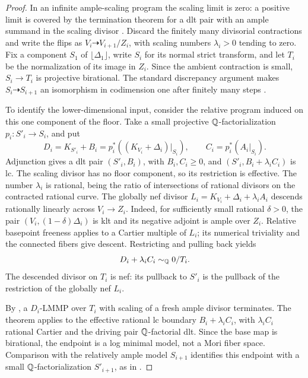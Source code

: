 \begin{proof}
In an infinite ample-scaling program the scaling limit is zero:
a positive limit is covered by the termination theorem for a
dlt pair with an ample summand in the scaling divisor
\cite[Theorem~1.9(ii), equivalently Theorem~4.1(ii)]
{Birkar2012Special}. Discard the finitely many divisorial
contractions and write the flips as \(V_i\dashrightarrow V_{i+1}/Z_i\),
with scaling numbers \(\lambda_i>0\) tending to zero.
Fix a component \(S_1\) of \(\lfloor\Delta_1\rfloor\), write
\(S_i\) for its normal strict transform, and let \(T_i\) be the
normalization of its image in \(Z_i\). Since the ambient contraction
is small, \(S_i\to T_i\) is projective birational. The standard
discrepancy argument makes \(S_i\dashrightarrow S_{i+1}\)
an isomorphism in codimension one after finitely many steps
\cite[proof of Lemma~3.6]{Birkar2010}.

To identify the lower-dimensional input, consider the relative
program induced on this one component of the floor.
Take a small projective \(\mathbb{Q}\)-factorialization
\(p_i:S'_i\to S_i\), and put
\[
 D_i=K_{S'_i}+B_i=p_i^*((K_{V_i}+\Delta_i)|_{S_i}),
 \qquad C_i=p_i^*(A_i|_{S_i}).
\]
Adjunction gives a dlt pair \((S'_i,B_i)\), with \(B_i,C_i\geq0\),
and \((S'_i,B_i+\lambda_i C_i)\) is lc. The scaling divisor
has no floor component, so its restriction is effective.
The number \(\lambda_i\) is rational, being the ratio of
intersections of rational divisors on the contracted rational curve.
The globally nef divisor
\(L_i=K_{V_i}+\Delta_i+\lambda_i A_i\) descends rationally
linearly across \(V_i\to Z_i\). Indeed, for sufficiently small
rational \(\delta>0\), the pair
\((V_i,(1-\delta)\Delta_i)\) is klt and its negative adjoint
is ample over \(Z_i\). Relative basepoint freeness applies to a
Cartier multiple of \(L_i\); its numerical triviality and the
connected fibers give descent. Restricting and pulling back yields
\[
 D_i+\lambda_i C_i\sim_{\mathbb{Q}}0/T_i.
\]
The descended divisor on $T_i$ is nef: its pullback to $S'_i$
is the pullback of the restriction of the globally nef $L_i$.

By \cite[Theorem~1.1(3)]{Birkar2012Special}, a \(D_i\)-LMMP
over \(T_i\) with scaling of a fresh ample divisor terminates.
The theorem applies to the effective rational lc boundary
\(B_i+\lambda_i C_i\), with \(\lambda_i C_i\) rational Cartier
and the driving pair \(\mathbb{Q}\)-factorial dlt. Since the base map
is birational, the endpoint is a log minimal model, not a Mori
fiber space. Comparison with the relatively ample model
\(S_{i+1}\) identifies this endpoint with a small
\(\mathbb{Q}\)-factorialization \(S'_{i+1}\), as in
\cite[Remarks~2.9--2.10]{Birkar2012Special}.


\end{proof}
